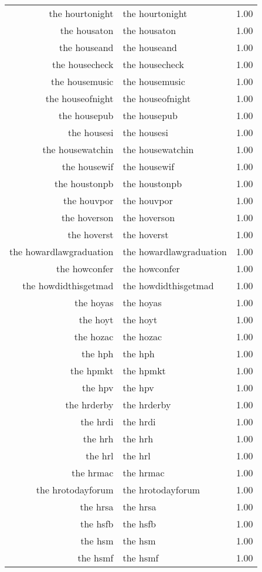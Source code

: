 \begin{table}[ht]
\begin{tabular}{rlr}
  the hourtonight & the hourtonight & 1.00 \\ 
  the housaton & the housaton & 1.00 \\ 
  the houseand & the houseand & 1.00 \\ 
  the housecheck & the housecheck & 1.00 \\ 
  the housemusic & the housemusic & 1.00 \\ 
  the houseofnight & the houseofnight & 1.00 \\ 
  the housepub & the housepub & 1.00 \\ 
  the housesi & the housesi & 1.00 \\ 
  the housewatchin & the housewatchin & 1.00 \\ 
  the housewif & the housewif & 1.00 \\ 
  the houstonpb & the houstonpb & 1.00 \\ 
  the houvpor & the houvpor & 1.00 \\ 
  the hoverson & the hoverson & 1.00 \\ 
  the hoverst & the hoverst & 1.00 \\ 
  the howardlawgraduation & the howardlawgraduation & 1.00 \\ 
  the howconfer & the howconfer & 1.00 \\ 
  the howdidthisgetmad & the howdidthisgetmad & 1.00 \\ 
  the hoyas & the hoyas & 1.00 \\ 
  the hoyt & the hoyt & 1.00 \\ 
  the hozac & the hozac & 1.00 \\ 
  the hph & the hph & 1.00 \\ 
  the hpmkt & the hpmkt & 1.00 \\ 
  the hpv & the hpv & 1.00 \\ 
  the hrderby & the hrderby & 1.00 \\ 
  the hrdi & the hrdi & 1.00 \\ 
  the hrh & the hrh & 1.00 \\ 
  the hrl & the hrl & 1.00 \\ 
  the hrmac & the hrmac & 1.00 \\ 
  the hrotodayforum & the hrotodayforum & 1.00 \\ 
  the hrsa & the hrsa & 1.00 \\ 
  the hsfb & the hsfb & 1.00 \\ 
  the hsm & the hsm & 1.00 \\ 
  the hsmf & the hsmf & 1.00 \\ 

\end{tabular}
\end{table}
